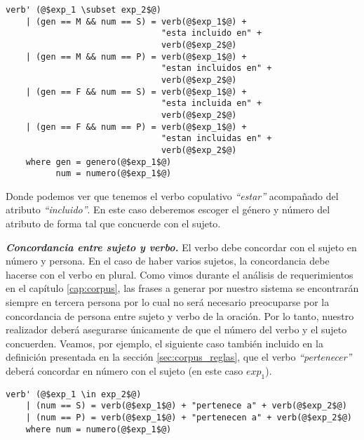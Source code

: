 \begin{mdframed}[style=codebox]
\begin{verbatim}
verb' (@$exp_1 \subset exp_2$@)
    | (gen == M && num == S) = verb(@$exp_1$@) + 
                               "esta incluido en" + 
                               verb(@$exp_2$@) 
    | (gen == M && num == P) = verb(@$exp_1$@) + 
                               "estan incluidos en" + 
                               verb(@$exp_2$@) 
    | (gen == F && num == S) = verb(@$exp_1$@) + 
                               "esta incluida en" + 
                               verb(@$exp_2$@) 
    | (gen == F && num == P) = verb(@$exp_1$@) + 
                               "estan incluidas en" + 
                               verb(@$exp_2$@) 
    where gen = genero(@$exp_1$@)
          num = numero(@$exp_1$@)
\end{verbatim}
\end{mdframed}

\noindent
Donde podemos ver que tenemos el verbo copulativo \emph{``estar''} acompañado del atributo \emph{``incluido''}. En este caso deberemos escoger el género y número del atributo de forma tal que concuerde con el sujeto.

\medskip
\noindent
\textbf{\emph{Concordancia entre sujeto y verbo.}} El verbo debe concordar con el sujeto en número y persona. En el caso de haber varios sujetos, la concordancia debe hacerse con el verbo en plural. Como vimos durante el análisis de requerimientos en el capítulo \ref{cap:corpus}, las frases a generar por nuestro sistema se encontrarán siempre en tercera persona por lo cual no será necesario preocuparse por la concordancia de persona entre sujeto y verbo de la oración. Por lo tanto, nuestro realizador deberá asegurarse únicamente de que el número del verbo y el sujeto concuerden.
\noindent
Veamos, por ejemplo, el siguiente caso también incluido en la definición presentada en la sección \ref{sec:corpus_reglas}, que el verbo \emph{``pertenecer''} deberá concordar en número con el sujeto (en este caso $exp_1$). 

\begin{mdframed}[style=codebox]
\begin{verbatim}
verb' (@$exp_1 \in exp_2$@)
    | (num == S) = verb(@$exp_1$@) + "pertenece a" + verb(@$exp_2$@) 
    | (num == P) = verb(@$exp_1$@) + "pertenecen a" + verb(@$exp_2$@) 
    where num = numero(@$exp_1$@)
\end{verbatim}
\end{mdframed}

